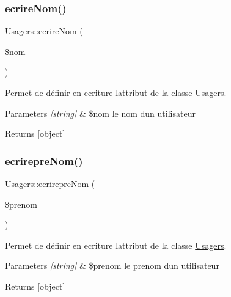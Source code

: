 \subsubsection{\texorpdfstring{ecrire\+Nom()}{ecrireNom()}}
{\footnotesize\ttfamily Usagers\+::ecrire\+Nom (\begin{DoxyParamCaption}\item[{}]{\$nom }\end{DoxyParamCaption})}



Permet de définir en ecriture l\textquotesingle{}attribut de la classe \hyperlink{class_usagers}{Usagers}. 


\begin{DoxyParams}{Parameters}
{\em \mbox{[}string\mbox{]}} & \$nom le nom d\textquotesingle{}un utilisateur \\
\hline
\end{DoxyParams}
\begin{DoxyReturn}{Returns}
\mbox{[}object\mbox{]} 
\end{DoxyReturn}
\mbox{\label{class_usagers_afa083ffdd8e53b32094469378b3ac1f0}} 
\subsubsection{\texorpdfstring{ecrirepre\+Nom()}{ecrirepreNom()}}
{\footnotesize\ttfamily Usagers\+::ecrirepre\+Nom (\begin{DoxyParamCaption}\item[{}]{\$prenom }\end{DoxyParamCaption})}



Permet de définir en ecriture l\textquotesingle{}attribut de la classe \hyperlink{class_usagers}{Usagers}. 


\begin{DoxyParams}{Parameters}
{\em \mbox{[}string\mbox{]}} & \$prenom le prenom d\textquotesingle{}un utilisateur \\
\hline
\end{DoxyParams}
\begin{DoxyReturn}{Returns}
\mbox{[}object\mbox{]} 
\end{DoxyReturn}
\mbox{\label{class_usagers_aa40ca40ce800d088ad78b61c42c59c20}} 
